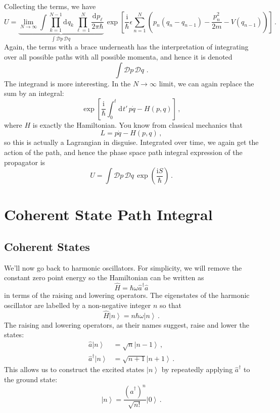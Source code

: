 \documentclass{article}
\theoremstyle{plain}\theoremheaderfont{\normalfont\itshape}\theorembodyfont{\rmfamily}\theoremseparator{.}\newtheorem*{rem}{Remark}\newtheorem*{ex}{Example}\newtheorem*{proof}{Proof}\newtheorem*{altp}{Alternative proof}
\theoremstyle{plain}\theoremheaderfont{\normalfont\bfseries}\theorembodyfont{\rmfamily}\theoremseparator{.}\newtheorem{thm}{Theorem}[section]\newtheorem{lem}[thm]{Lemma}\newtheorem{prop}[thm]{Proposition}\newtheorem*{cor}{Corollary}\newtheorem{defn}[thm]{Definition}\newtheorem{clm}[thm]{Claim}\newtheorem{clminproof}{Claim}
\theoremstyle{break}\theoremheaderfont{\normalfont\itshape}\theorembodyfont{\rmfamily}\theoremseparator{.\medskip}\newtheorem*{proofskip}{Proof}\newtheorem*{exs}{Examples}\newtheorem*{rems}{Remarks}
\theoremstyle{break}\theoremheaderfont{\normalfont\bfseries}\theorembodyfont{\rmfamily}\theoremseparator{.\medskip}\newtheorem{lemskip}[thm]{Lemma}\newtheorem{defnskip}[thm]{Definition}\newtheorem{propskip}[thm]{Proposition}\newtheorem{thmskip}[thm]{Theorem}
\numberwithin{equation}{section}
\newcommand{\ii}{\mathrm{i}}
\newcommand{\dd}[2][]{\mathrm{d}^{#1} #2\,}
\newcommand{\DD}[1]{\mathcal{D} #1\,}
\renewcommand{\d}[2][]{\mathrm{d}^{#1} #2}
\newcommand{\ket}[1]{\left| #1 \right\rangle}
\newcommand{\rai}{\hat{a}^\dagger}
\newcommand{\low}{\hat{a}}
\begin{document}
    Collecting the terms, we have
    \begin{equation}
        U=\underbrace{\lim_{N\to\infty}\int\prod_{k=1}^{N-1}\dd{q_k}\prod_{\ell = 1}^{N}\frac{\d{p_\ell}}{2\pi\hbar}}_{\int\DD{p}\DD{q}}\, \exp\left[\frac{\ii}{\hbar}\epsilon\sum_{n=1}^{N}\left( p_n(q_n-q_{n-1})-\frac{p_n^2}{2m}-V(q_{n-1})\right)\right]\,.
    \end{equation}
    Again, the terms with a brace underneath has the interpretation of integrating over all possible paths with all possible momenta, and hence it is denoted
    \begin{equation}
        \int\DD{p}\DD{q}\,.
    \end{equation}
    The integrand is more interesting. In the \(N\to\infty\) limit, we can again replace the sum by an integral:
    \begin{equation}
        \exp\left[\frac{\ii}{\hbar}\int_{0}^{t}\dd{t'} p\dot{q}-H(p,q)\right]\,,
    \end{equation}
    where \(H\) is exactly the Hamiltonian. You know from classical mechanics that
    \begin{equation}
        L=p\dot{q}-H(p,q)\,,
    \end{equation}
    so this is actually a Lagrangian in disguise. Integrated over time, we again get the action of the path, and hence the phase space path integral expression of the propagator is
    \begin{equation}
        U=\int\DD{p}\DD{q} \exp\left(\frac{\ii S}{\hbar}\right)\,.
    \end{equation}

    \section{Coherent State Path Integral}
    \subsection{Coherent States}
    We'll now go back to harmonic oscillators. For simplicity, we will remove the constant zero point energy so the Hamiltonian can be written as
    \begin{equation}
        \hat{H}=\hbar\omega\rai\low
    \end{equation}
    in terms of the raising and lowering operators. The eigenstates of the harmonic oscillator are labelled by a non-negative integer \(n\) so that
    \begin{equation}
        \hat{H}\ket{n}=n\hbar\omega\ket{n}\,.
    \end{equation}
    The raising and lowering operators, as their names suggest, raise and lower the states:
    \begin{align}
        \low\ket{n}&=\sqrt{n}\ket{n-1}\,,\\
        \rai \ket{n}&=\sqrt{n+1}\ket{n+1}\,.
    \end{align}
    This allows us to construct the excited states \(\ket{n}\) by repeatedly applying \(\rai\) to the ground state:
    \begin{equation}
        \ket{n}=\frac{(\rai)^n}{\sqrt{n!}}\ket{0}\,.
    \end{equation}
\end{document}
